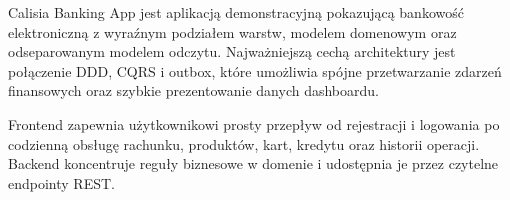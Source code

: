 \documentclass[12pt,a4paper]{article}
\begin{document}
Calisia Banking App jest aplikacją demonstracyjną pokazującą bankowość elektroniczną z wyraźnym podziałem warstw, modelem domenowym oraz odseparowanym modelem odczytu. Najważniejszą cechą architektury jest połączenie DDD, CQRS i outbox, które umożliwia spójne przetwarzanie zdarzeń finansowych oraz szybkie prezentowanie danych dashboardu.

Frontend zapewnia użytkownikowi prosty przepływ od rejestracji i logowania po codzienną obsługę rachunku, produktów, kart, kredytu oraz historii operacji. Backend koncentruje reguły biznesowe w domenie i udostępnia je przez czytelne endpointy REST.
\end{document}
